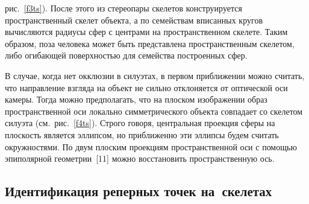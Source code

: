\begin{multicols}{2}
\bigskip
\addtocounter{figure}{1}


\noindent
 рис.~\ref{f3ts}). После этого из 
стереопары скелетов конструируется пространственный скелет объекта, а по 
семействам вписанных кругов вычисляются радиусы сфер с центрами на 
пространственном скелете. Таким образом, поза человека может быть 
представлена пространственным скелетом, либо огибающей поверхностью для 
семейства построенных сфер.
     
     В случае, когда нет окклюзии в силуэтах, в первом приближении можно 
считать, что направление взгляда на объект не сильно отклоняется от 
оптической оси камеры. Тогда можно предполагать, что на плоском 
изображении образ пространственной оси локально симметрического объекта 
совпадает со скелетом силуэта (см.\ рис.~\ref{f4ts}). Строго говоря, центральная 
проекция сферы на плоскость является эллипсом, но приближенно эти эллипсы 
будем считать окружностями. По двум плоским проекциям пространственной 
оси с помощью эпиполярной геометрии~[11] можно восстановить 
пространственную ось.
     


\subsection{Идентификация реперных точек на~скелетах} %
     

\end{multicols}

